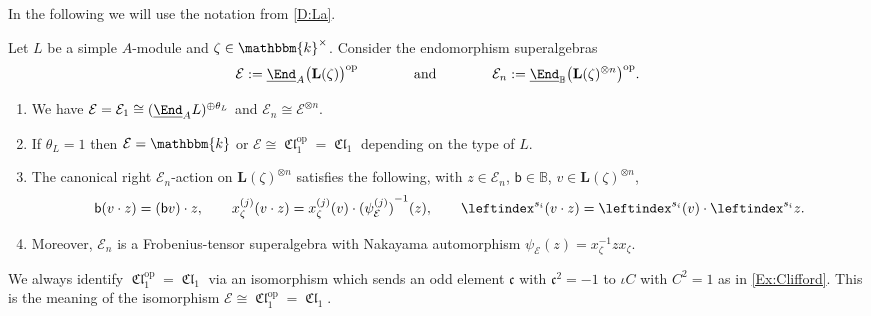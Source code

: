 \documentclass[a4paper,11pt]{amsart}
\newcommand{\uEnd}{\underline{\End}}
\numberwithin{equation}{subsection}
\theoremstyle{definition}
\theoremstyle{theorem}
\theoremstyle{remark}
\DeclareMathOperator\Cl{\mathfrak{Cl}}
\newcommand\bb{\mathsf{b}}
\newcommand\kk{\mathbbm{k}}
\newcommand{\Bo}{\mathbb{B}}
\begin{document}
In the following we will use the notation from \autoref{D:La}.
\begin{Proposition}\label{L:endoalg}
  Let $L$ be a simple $A$-module and $\zeta\in\kk^\times$. Consider the endomorphism superalgebras
  \[
    \mathcal E:=\uEnd_A\bigl(\mathbf L(\zeta)\bigr)^{\mathrm{op}}\qquad\qquad\text{and}\qquad\qquad
    \mathcal E_n:=\uEnd_{\Bo}\bigl(\mathbf L(\zeta)^{\otimes n}\bigr)^{\mathrm{op}} .
  \]
  \begin{enumerate}
  \item \label{L:endoalg1} We have  $\mathcal E=\mathcal E_1\cong(\uEnd_AL)^{\oplus \theta_L}$ and $\mathcal E_n\cong\mathcal E^{\otimes n}$.
  \item  \label{L:endoalg2} If $\theta_L=1$ then $\mathcal E=\kk$ or $\mathcal E\cong\Cl_1^\mathrm{op}= \Cl_1$ depending on the type of $L$.
  \item \label{L:endoalg3}
  The canonical right $\mathcal E_n$-action on $\mathbf L(\zeta)^{\otimes n}$ satisfies the following, with $z\in\mathcal E_n$, $\bb\in\Bo$, $v\in \mathbf L(\zeta)^{\otimes n}$,
  \begin{equation}\label{E:bimodule}
    \bb(v\cdot z)=(\bb v)\cdot z,\qquad
    x_\zeta^{(j)}(v\cdot z)=x_\zeta^{(j)}(v)\cdot{(\psi_{\mathcal E}^{(j)})}^{-1}(z),\qquad
    \leftindex^{s_i}(v\cdot z)= \leftindex^{s_i}(v)\cdot\leftindex^{s_i}z .
  \end{equation}
  \item  \label{L:endoalg4} Moreover,  $\mathcal E_n$ is a Frobenius-tensor superalgebra with Nakayama automorphism $\psi_{\mathcal E}(z)=x_\zeta^{-1}zx_\zeta$.
  \end{enumerate}
  \end{Proposition}
\begin{Remark}\label{R:Clop}
We always identify $\Cl_1^\mathrm{op}=\Cl_1$ via an isomorphism which
sends an odd element $\mathfrak{c}$ with $\mathfrak{c}^{2}=-1$ to $\iota
C$ with $C^2=1$  as in \autoref{Ex:Clifford}. This is the meaning of the
isomorphism $\mathcal E\cong \Cl_1^\mathrm{op}=\Cl_1$.
 \end{Remark}
\end{document}
